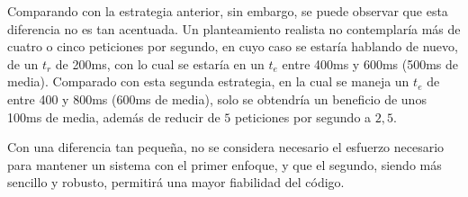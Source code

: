 Comparando con la estrategia anterior, sin embargo, se puede observar que esta diferencia no es tan acentuada. Un planteamiento realista no contemplaría más de cuatro o cinco peticiones por segundo, en cuyo caso se estaría hablando de nuevo, de un $t_r$ de 200ms, con lo cual se estaría en un $t_e$ entre 400ms y 600ms (500ms de media). Comparado con esta segunda estrategia, en la cual se maneja un $t_e$ de entre 400 y 800ms (600ms de media), solo se obtendría un beneficio de unos 100ms de media, además de reducir de $5$ peticiones por segundo a $2,5$.

Con una diferencia tan pequeña, no se considera necesario el esfuerzo necesario para mantener un sistema con el primer enfoque, y que el segundo, siendo más sencillo y robusto, permitirá una mayor fiabilidad del código.



